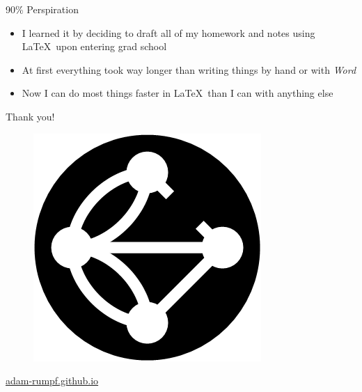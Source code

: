 \documentclass{beamer} %
\begin{document}
\begin{frame}{90\% Perspiration}

\begin{itemize}
	\item I learned it by deciding to draft all of my homework and notes using \LaTeX\ upon entering grad school
	\item At first everything took way longer than writing things by hand or with \textit{Word}
	\item Now I can do most things faster in \LaTeX\ than I can with anything else
\end{itemize}

\end{frame}

\begin{frame}{Thank you!}

\centering

\begin{figure}
	\includegraphics[height=0.3\textheight]{figures/broken_konigsberg_circle.png}
\end{figure}

\url{adam-rumpf.github.io}

\end{frame}
\end{document}
